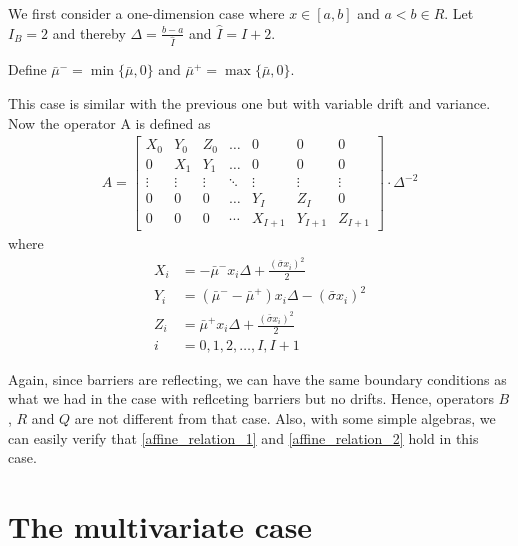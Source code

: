 \documentclass[11pt]{article}
\begin{document}
We first consider a one-dimension case where $x\in [a, b]$ and $a<b\in R$. Let $I_B = 2$ and thereby $\Delta  = \frac{b-a}{\hat{I}}$ and $\hat{I} = I+2$. 

Define $\bar{\mu}^- = \min\{\bar{\mu}, 0\}$ and $\bar{\mu}^+  = \max\{\bar{\mu}, 0\}$.

This case is similar with the previous one but with variable drift and variance. Now the operator A is defined as
\begin{align}
A = \begin{bmatrix}
X_0&Y_0&Z_0&\dots&0&0&0\\
0&X_1&Y_1&\dots&0&0&0\\
\vdots&\vdots&\vdots&\ddots&\vdots&\vdots&\vdots\\
0&0&0&\dots&Y_I&Z_I&0\\
0&0&0&\cdots&X_{I+1}&Y_{I+1}&Z_{I+1}
\end{bmatrix}\cdot \Delta^{-2}\nonumber
\end{align}
where
\begin{align*}
X_i &= -\bar{\mu}^-x_i\Delta+\frac{(\bar{\sigma}x_i)^2}{2}\\
Y_i &= (\bar{\mu}^--\bar{\mu}^+)x_i\Delta-(\bar{\sigma}x_i)^2\\
Z_i &=\bar{\mu}^+x_i\Delta+\frac{(\bar{\sigma}x_i)^2}{2}\\
i & = 0, 1, 2,\dots, I, I+1
\end{align*}

Again, since barriers are reflecting, we can have the same boundary conditions as what we had in the case with reflceting barriers but no drifts. Hence, operators $B$, $R$ and $Q$ are not different from that case. Also, with some simple algebras, we can easily verify that \eqref{affine_relation_1} and \eqref{affine_relation_2} hold in this case.


\iffalse %
\section{The multivariate case}
\end{document}
